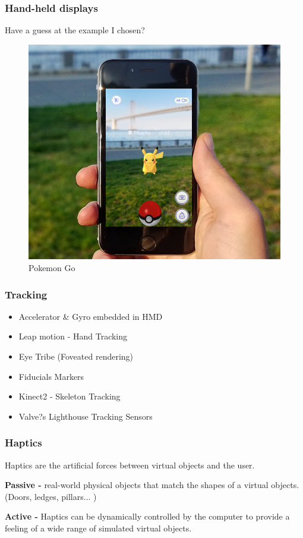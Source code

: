 \begin{frame}
	\frametitle{Hand-held displays}
	Have a guess at the example I chosen?
	\pause
	\begin{figure}
		\includegraphics[scale=0.25]{assets/pgo.png}
		\caption{Pokemon Go}
	\end{figure}
	
\end{frame}

\begin{frame}
	\frametitle{Tracking}
	\begin{itemize}
		\item Accelerator \& Gyro embedded in HMD
		\item Leap motion - Hand Tracking
		\item Eye Tribe (Foveated rendering)
		\item Fiducials Markers
		\item Kinect2 - Skeleton Tracking
		\item Valve?s Lighthouse Tracking Sensors
	\end{itemize}
\end{frame}

\begin{frame}
	\frametitle{Haptics}
	Haptics are the artificial forces between virtual objects and the user.
	\vspace{.2in}
	
	\textbf{Passive -}
	real-world physical objects that match the shapes of a virtual objects. (Doors, ledges, pillars... )
	\vspace{.2in}
	
	\textbf{Active -} Haptics can be dynamically controlled by the computer to provide a feeling of a wide range of simulated virtual objects.
	
\end{frame}

